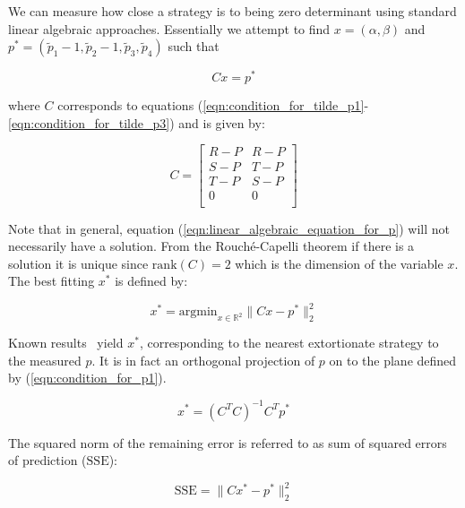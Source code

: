 \documentclass[a4paper]{article}
\newcommand{\SSe}{\text{SSE}}
\begin{document}
We can measure how close a strategy is to being zero determinant using standard
linear algebraic approaches. Essentially we attempt to find \(x=(\alpha,
\beta)\) and \(p^*=(\tilde p_1 - 1, \tilde p_2 - 1, \tilde p_3, \tilde p_4)\)
such that

\begin{equation}\label{eqn:linear_algebraic_equation_for_p}
    Cx= p^*
\end{equation}

where \(C\) corresponds to equations
(\ref{eqn:condition_for_tilde_p1}-\ref{eqn:condition_for_tilde_p3}) and is
given by:

\begin{equation}\label{eqn:definition_of_C}
    C =
    \begin{bmatrix}
        R - P & R- P \\
        S - P & T- P \\
        T - P & S- P \\
        0     & 0 \\
    \end{bmatrix}
\end{equation}

Note that in general, equation (\ref{eqn:linear_algebraic_equation_for_p}) will
not necessarily have a solution. From the Rouch\'{e}-Capelli theorem if there is
a solution it is unique since \(\text{rank}(C)=2\) which is the dimension of the
variable \(x\). The best fitting \(x^*\) is defined by:

\begin{equation}\label{eqn:x_star}
    x^* = \text{argmin}_{x\in\mathbb{R}^2}\|C x- p^*\|_2^2
\end{equation}

Known results~\cite{kutner2004applied, rao1973linear, wakefield2013bayesian} yield
$x^*$, corresponding to the nearest extortionate strategy to the
measured \(p\). It is in fact an orthogonal projection of \(p\) on to the plane
defined by (\ref{eqn:condition_for_p1}).

\begin{equation}\label{eqn:x_star_formula}
    x^* = {\left(C^{T}C\right)}^{-1}C^{T}p^{*}
\end{equation}

The squared norm of the remaining error is referred to as sum of squared errors
of prediction (\(\SSe\)):

\begin{equation}\label{eqn:r_squared}
    \SSe = \|C x^*- p^*\|_2^2
\end{equation}
\end{document}
